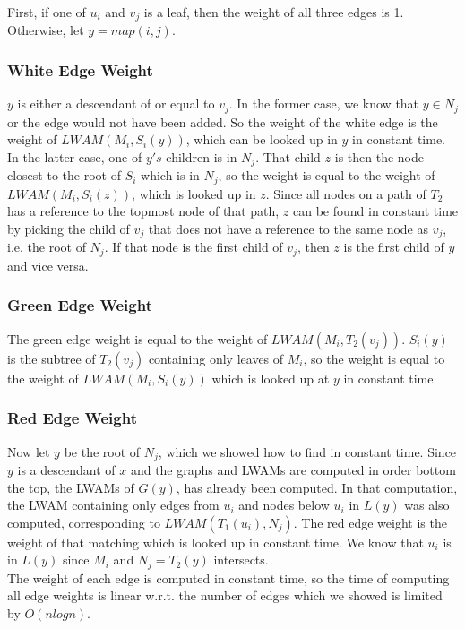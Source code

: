 First, if one of $u_i$ and $v_j$ is a leaf, then the weight of all three edges is 1. Otherwise, let $y=map(i,j)$.

\subsubsection{White Edge Weight}
$y$ is either a descendant of or equal to $v_j$. In the former case, we know that $y \in N_j$ or the edge would not have been added. So the weight of the white edge is the weight of $LWAM(M_i, S_i(y))$, which can be looked up in $y$ in constant time. In the latter case, one of $y's$ children is in $N_j$. That child $z$ is then the node closest to the root of $S_i$ which is in $N_j$, so the weight is equal to the weight of $LWAM(M_i, S_i(z))$, which is looked up in $z$. Since all nodes on a path of $T_2$ has a reference to the topmost node of that path, $z$ can be found in constant time by picking the child of $v_j$ that does not have a reference to the same node as $v_j$, i.e. the root of $N_j$. If that node is the first child of $v_j$, then $z$ is the first child of $y$ and vice versa.

\subsubsection{Green Edge Weight}
The green edge weight is equal to the weight of $LWAM(M_i,T_2(v_j))$. $S_i(y)$ is the subtree of $T_2(v_j)$ containing only leaves of $M_i$, so the weight is equal to the weight of $LWAM(M_i, S_i(y))$ which is looked up at $y$ in constant time.

\subsubsection{Red Edge Weight}
Now let $y$ be the root of $N_j$, which we showed how to find in constant time. Since $y$ is a descendant of $x$ and the graphs and LWAMs are computed in order bottom the top, the LWAMs of $G(y)$, has already been computed. In that computation, the LWAM containing only edges from $u_i$ and nodes below $u_i$ in $L(y)$ was also computed, corresponding to $LWAM(T_1(u_i), N_j)$. The red edge weight is the weight of that matching which is looked up in constant time. We know that $u_i$ is in $L(y)$ since $M_i$ and $N_j = T_2(y)$ intersects.\\


The weight of each edge is computed in constant time, so the time of computing all edge weights is linear w.r.t. the number of edges which we showed is limited by $O(nlogn)$.

